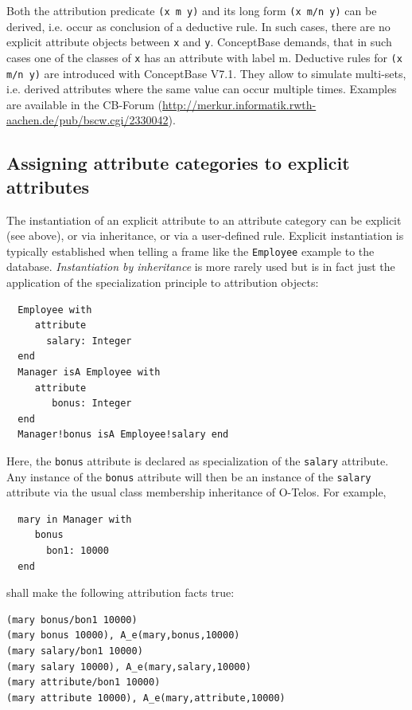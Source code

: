 Both the attribution predicate {\tt (x m y)} and its long form {\tt (x m/n y)} can be derived,
i.e. occur as conclusion of a deductive rule. In such cases, there are no explicit attribute
objects between {\tt x}  and {\tt y}. ConceptBase demands, that in such cases one of the classes
of {\tt x}  has an attribute with label {m}. Deductive rules for {\tt (x m/n y)} are
introduced with ConceptBase V7.1. They allow to simulate multi-sets, i.e. derived attributes
where the same value can occur multiple times. 
Examples are available in the CB-Forum
(\url{http://merkur.informatik.rwth-aachen.de/pub/bscw.cgi/2330042}).

\subsection{Assigning attribute categories to explicit attributes}
\label{sec:aepred}

The instantiation of an explicit attribute to an attribute category can be explicit (see above), 
or via inheritance, or via a user-defined rule.  
Explicit instantiation is typically established when telling a frame
like the {\tt Employee} example to the database. {\em Instantiation by inheritance\/} is more rarely
used but is in fact just the application of the specialization principle to attribution objects:

\begin{verbatim}
  Employee with
     attribute
       salary: Integer
  end
  Manager isA Employee with
     attribute
        bonus: Integer
  end
  Manager!bonus isA Employee!salary end
\end{verbatim}


Here, the {\tt bonus}  attribute is declared as specialization of the {\tt salary} attribute. Any 
instance of the {\tt bonus} attribute will then be an instance of the {\tt salary} attribute via
the usual class membership inheritance of O-Telos.  For example,

\begin{verbatim}
  mary in Manager with
     bonus
       bon1: 10000
  end
\end{verbatim}

shall make the following attribution facts true:

\begin{verbatim}
(mary bonus/bon1 10000)
(mary bonus 10000), A_e(mary,bonus,10000)
(mary salary/bon1 10000)
(mary salary 10000), A_e(mary,salary,10000)
(mary attribute/bon1 10000)
(mary attribute 10000), A_e(mary,attribute,10000)
\end{verbatim}

